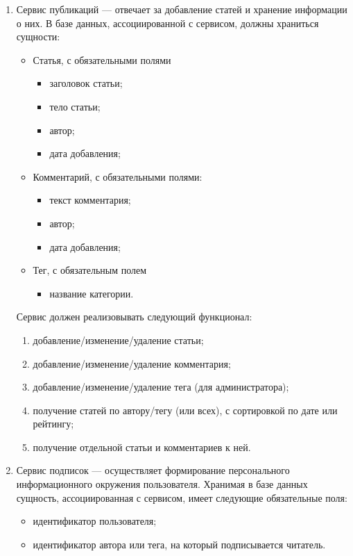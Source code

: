 \documentclass{bmstu-gost-7-32}
\begin{document}
\begin{enumerate}
	\item Сервис публикаций — отвечает за добавление статей и хранение информации о них.
	В базе данных, ассоциированной с сервисом, должны храниться сущности:
	\begin{itemize}
		\item Статья, с обязательными полями
		\begin{itemize}
			\item заголовок статьи;
			\item тело статьи;
			\item автор;
			\item дата добавления;
		\end{itemize}
		\item Комментарий, с обязательными полями:
		\begin{itemize}
			\item текст комментария;
			\item автор;
			\item дата добавления;
		\end{itemize}
		\item Тег, с обязательным полем
		\begin{itemize}
			\item название категории.
		\end{itemize}
	\end{itemize}
	Сервис должен реализовывать следующий функционал:
	\begin{enumerate}
		\item добавление/изменение/удаление статьи;
		\item добавление/изменение/удаление комментария;
		\item добавление/изменение/удаление тега (для администратора);
		\item получение статей по автору/тегу (или всех), с сортировкой по дате или рейтингу;
		\item получение отдельной статьи и комментариев к ней.
	\end{enumerate}
	\item Сервис подписок — осуществляет формирование персонального информационного окружения пользователя.
	Хранимая в базе данных сущность, ассоциированная с сервисом, имеет следующие обязательные поля:
	\begin{itemize}
		\item идентификатор пользователя;
		\item идентификатор автора или тега, на который подписывается читатель.

\end{itemize}
\end{enumerate}
\end{document}
